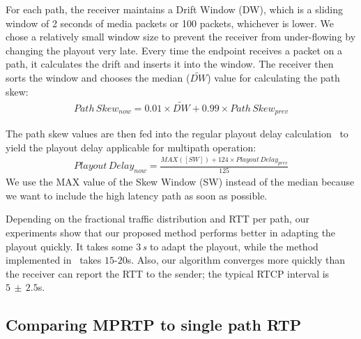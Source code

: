 For each path, the receiver maintains a Drift Window (DW), which is a sliding
window of 2 seconds of media packets or 100 packets, whichever is lower. We
chose a relatively small window size to prevent the receiver from under-flowing
by changing the playout very late. Every time the endpoint receives a packet
on a path, it calculates the drift and inserts it into the window. The
receiver then sorts the window and chooses the median ($\widetilde{DW}$) value
for calculating the path skew: 
\begin{align*}
Path\,Skew_{now} = 0.01 \times \widetilde{DW} + 0.99\times Path\,Skew_{prev}
\end{align*}

The path skew values are then fed into the regular playout delay
calculation~\cite{Fober05,Colin03} to yield the playout delay  applicable for
multipath operation:
\begin{align*}
Playout\,Delay_{now} = \frac{MAX([SW]) + 124 \times Playout\,Delay_{prev}}{125}
\end{align*}
We use the MAX value of the Skew Window (SW) instead of the median because we
want to include the high latency path as soon as possible.

Depending on the fractional traffic distribution and RTT per path, our
experiments show that our proposed method performs better in adapting the
playout quickly. It takes some 3\,\emph{s} to adapt the playout, while the method
implemented in~\cite{Fober05,Colin03} takes $15$-$20$s. Also, our algorithm
converges more quickly than the receiver can report the RTT to the sender; the
typical RTCP interval is $5\,\pm\,2.5$s.

\subsection{Comparing MPRTP to single path RTP}

